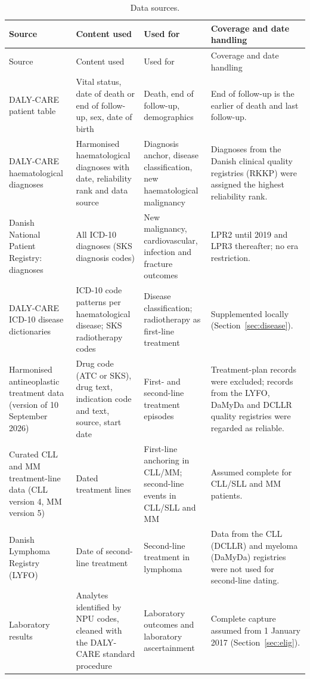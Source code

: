\documentclass[10pt]{article}
\begin{document}
{\footnotesize
\setlength{\tabcolsep}{3pt}
\begin{longtable}{L{3.3cm}L{4.3cm}L{4.0cm}L{4.4cm}}
\caption{Data sources.}\label{tab:sources}\\
\toprule
Source & Content used & Used for & Coverage and date handling\\
\midrule\endfirsthead
\toprule
Source & Content used & Used for & Coverage and date handling\\
\midrule\endhead
DALY-CARE patient table & Vital status, date of death or end of follow-up, sex, date of birth & Death, end of follow-up, demographics & End of follow-up is the earlier of death and last follow-up.\\
DALY-CARE haematological diagnoses & Harmonised haematological diagnoses with date, reliability rank and data source & Diagnosis anchor, disease classification, new haematological malignancy & Diagnoses from the Danish clinical quality registries (RKKP) were assigned the highest reliability rank.\\
Danish National Patient Registry: diagnoses & All ICD-10 diagnoses (SKS diagnosis codes) & New malignancy, cardiovascular, infection and fracture outcomes & LPR2 until 2019 and LPR3 thereafter; no era restriction.\\
DALY-CARE ICD-10 disease dictionaries & ICD-10 code patterns per haematological disease; SKS radiotherapy codes & Disease classification; radiotherapy as first-line treatment & Supplemented locally (Section~\ref{sec:disease}).\\
Harmonised antineoplastic treatment data (version of 10 September 2026) & Drug code (ATC or SKS), drug text, indication code and text, source, start date & First- and second-line treatment episodes & Treatment-plan records were excluded; records from the LYFO, DaMyDa and DCLLR quality registries were regarded as reliable.\\
Curated CLL and MM treatment-line data (CLL version 4, MM version 5) & Dated treatment lines & First-line anchoring in CLL/MM; second-line events in CLL/SLL and MM & Assumed complete for CLL/SLL and MM patients.\\
Danish Lymphoma Registry (LYFO) & Date of second-line treatment & Second-line treatment in lymphoma & Data from the CLL (DCLLR) and myeloma (DaMyDa) registries were not used for second-line dating.\\
Laboratory results & Analytes identified by NPU codes, cleaned with the DALY-CARE standard procedure & Laboratory outcomes and laboratory ascertainment & Complete capture assumed from 1 January 2017 (Section~\ref{sec:elig}).\\

\end{longtable}}
\end{document}
